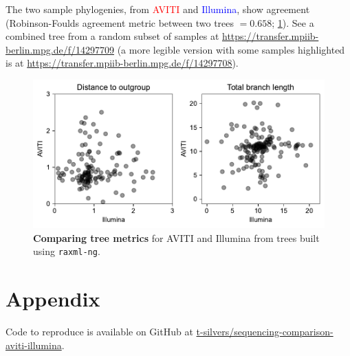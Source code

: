 \documentclass{article}
\begin{document}
The two sample phylogenies, from \textcolor{red}{AVITI} and \textcolor{blue}{Illumina}, show agreement (Robinson-Foulds agreement metric between two trees $=0.658$; \cref{figure:tree-metrics-comp}). 
See a combined tree from a random subset of samples at \url{https://transfer.mpiib-berlin.mpg.de/f/14297709} (a more legible version with some samples highlighted is at \url{https://transfer.mpiib-berlin.mpg.de/f/14297708}).

\begin{figure}[H]
    \centering
    \includegraphics[width=.6\textwidth]{figures/tree-metrics-comp}
    \caption{
        \textbf{Comparing tree metrics} for AVITI and Illumina from trees built using \texttt{raxml-ng}.
    }
    \label{figure:tree-metrics-comp}
\end{figure}

\section{Appendix}

Code to reproduce is available on GitHub at \href{https://github.com/t-silvers/sequencing-comparison-aviti-illumina}{t-silvers/sequencing-comparison-aviti-illumina}.
\end{document}
